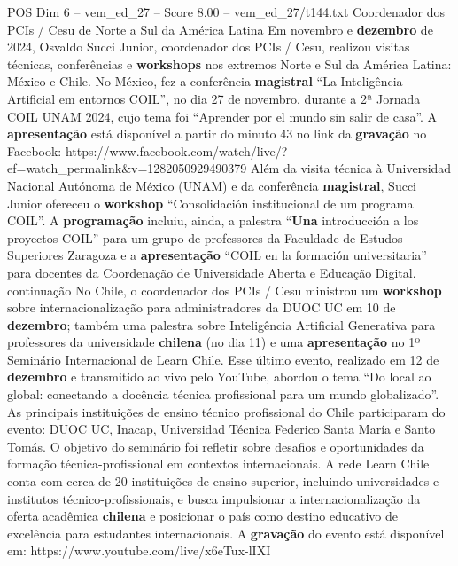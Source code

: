 \begin{textsample}{POS Dim 6 – vem\_ed\_27 – Score 8.00 – vem\_ed\_27/t144.txt}  \label{ex:f6_pos_148}
Coordenador dos PCIs / Cesu de Norte a Sul da América Latina Em novembro e \textbf{dezembro} de 2024, Osvaldo Succi Junior, coordenador dos PCIs / Cesu, realizou visitas técnicas, conferências e \textbf{workshops} nos extremos Norte e Sul da América Latina: México e Chile.
No México, fez a conferência \textbf{magistral} “La Inteligência Artificial em entornos COIL”, no dia 27 de novembro, durante a 2ª Jornada COIL UNAM 2024, cujo tema foi “Aprender por el mundo sin salir de casa”.
A \textbf{apresentação} está disponível a partir do minuto 43 no link da \textbf{gravação} no Facebook: https://www.facebook.com/watch/live/?ef=watch\_permalink\&v=1282050929490379 Além da visita técnica à Universidad Nacional Autónoma de México (UNAM) e da conferência \textbf{magistral}, Succi Junior ofereceu o \textbf{workshop} “Consolidación institucional de um programa COIL”.
A \textbf{programação} incluiu, ainda, a palestra “\textbf{Una} introducción a los proyectos COIL” para um grupo de professores da Faculdade de Estudos Superiores Zaragoza e a \textbf{apresentação} “COIL en la formación universitaria” para docentes da Coordenação de Universidade Aberta e Educação Digital. continuação No Chile, o coordenador dos PCIs / Cesu ministrou um \textbf{workshop} sobre internacionalização para administradores da DUOC UC em 10 de \textbf{dezembro}; também uma palestra sobre Inteligência Artificial Generativa para professores da universidade \textbf{chilena} (no dia 11) e uma \textbf{apresentação} no 1º Seminário Internacional de Learn Chile.
Esse último evento, realizado em 12 de \textbf{dezembro} e transmitido ao vivo pelo YouTube, abordou o tema “Do local ao global: conectando a docência técnica profissional para um mundo globalizado”.
As principais instituições de ensino técnico profissional do Chile participaram do evento: DUOC UC, Inacap, Universidad Técnica Federico Santa María e Santo Tomás.
O objetivo do seminário foi refletir sobre desafios e oportunidades da formação técnica-profissional em contextos internacionais.
A rede Learn Chile conta com cerca de 20 instituições de ensino superior, incluindo universidades e institutos técnico-profissionais, e busca impulsionar a internacionalização da oferta acadêmica \textbf{chilena} e posicionar o país como destino educativo de excelência para estudantes internacionais.
A \textbf{gravação} do evento está disponível em: https://www.youtube.com/live/x6eTux-lIXI

\end{textsample}
